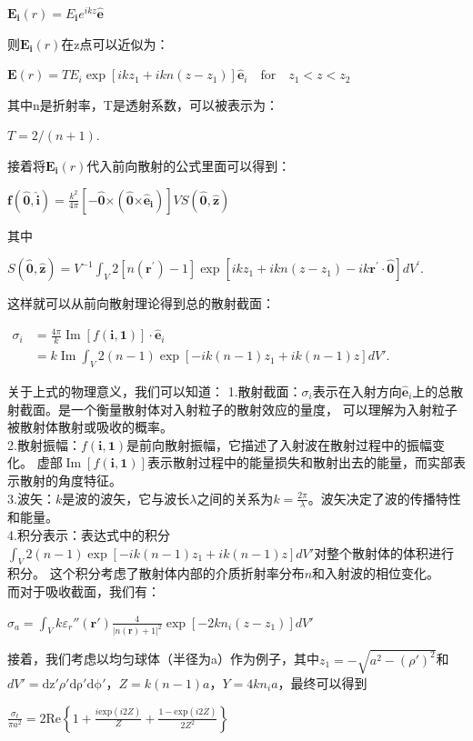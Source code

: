 \documentclass[12pt]{article}
\begin{document}
\begin{center}
    $\mathbf{E}_\mathbf{i}(r)=E_\mathbf{i}e^{ikz}\mathbf{\hat{e}}$
\end{center}
则$\mathbf{E}_\mathbf{i}(r)$在z点可以近似为：
\begin{center}
    $\displaystyle \mathbf{E}(r)=TE_i\exp[ikz_1+ikn(z-z_1)]\mathbf{\hat{e}}_i\quad\text{for}\quad z_1<z<z_2$
\end{center}
其中n是折射率，T是透射系数，可以被表示为：
\begin{center}
    $\displaystyle T=2/(n+1).$
\end{center}
接着将$\mathbf{E}_\mathbf{i}(r)$代入前向散射的公式里面可以得到：
\begin{center}
    $\displaystyle \mathbf{f}(\mathbf{\hat{0}},\mathbf{\hat{i}})=\frac{k^2}{4\pi}[-\mathbf{\hat{0}}\mathbf{\times}(\mathbf{\hat{0}}\mathbf{\times}\mathbf{\hat{e}_i})]VS(\mathbf{\hat{0}},\mathbf{\hat{z}})$
\end{center}
其中
\begin{center}
    $\displaystyle S(\mathbf{\hat{0}},\mathbf{\hat{z}})=V^{-1}\int_{V}2[n(\mathbf{r}^{\prime})-1]\exp[i k z_{1}+i k n(z-z_{1})-i k\mathbf{r}^{\prime}\cdot\mathbf{\hat{0}}]d V^{\prime}.$
\end{center}

这样就可以从前向散射理论得到总的散射截面：
\begin{center}
    $\displaystyle \begin{aligned}\sigma_i&=\frac{4\pi}{k}\operatorname{Im}[f(\mathbf{i},\mathbf{1})]\cdot\hat{\mathbf{e}}_i\\ 
        &=k\operatorname{Im}\int_V2(n-1)\exp[-ik(n-1)z_1+ik(n-1)z]dV'.\end{aligned}$
\end{center}
关于上式的物理意义，我们可以知道：
1.散射截面：$\sigma_i$表示在入射方向$\hat{\mathbf{e}}_i$上的总散射截面。是一个衡量散射体对入射粒子的散射效应的量度，
可以理解为入射粒子被散射体散射或吸收的概率。
\\
2.散射振幅：$f(\mathbf{i},\mathbf{1})$是前向散射振幅，它描述了入射波在散射过程中的振幅变化。
虚部$\operatorname{Im}[f(\mathbf{i},\mathbf{1})]$表示散射过程中的能量损失和散射出去的能量，而实部表示散射的角度特征。
\\
3.波矢：$k$是波的波矢，它与波长$\lambda$之间的关系为$k=\frac{2\pi}{\lambda}$。波矢决定了波的传播特性和能量。
\\
4.积分表示：表达式中的积分$\int_V2(n-1)\exp[-ik(n-1)z_1+ik(n-1)z]dV'$对整个散射体的体积进行积分。
这个积分考虑了散射体内部的介质折射率分布$n$和入射波的相位变化。\\
而对于吸收截面，我们有：
\begin{center}
    $\displaystyle \sigma_a=\int_V k\varepsilon_r''(\mathbf{r'})\frac{4}{|n(\mathbf{r})+1|^2}\exp[-2kn_i(z-z_1)]dV'$
\end{center}
接着，我们考虑以均匀球体（半径为a）作为例子，其中$z_1 = -\sqrt{a^2-(\rho')^2}$和$dV' = \mathrm{dz'}\rho'\mathrm{d\rho'}\mathrm{d\phi'}$，$Z = k(n-1)a$，$Y = 4kn_ia$，最终可以得到
\begin{center}
    $\displaystyle \frac{\sigma_t}{\pi a^2}=2\text{Re}\left\{1+\frac{i\text{exp}(i2Z)}{Z}+\frac{1-\text{exp}(i2Z)}{2Z^2}\right\}$
\end{center}
\end{document}
